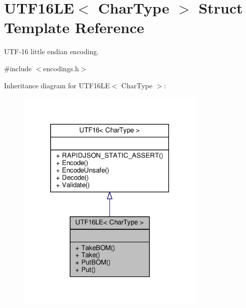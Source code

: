 \hypertarget{structUTF16LE}{}\section{U\+T\+F16\+LE$<$ Char\+Type $>$ Struct Template Reference}
\label{structUTF16LE}


U\+T\+F-\/16 little endian encoding.  




{\ttfamily \#include $<$encodings.\+h$>$}



Inheritance diagram for U\+T\+F16\+LE$<$ Char\+Type $>$\+:
\nopagebreak
\begin{figure}[H]
\begin{center}
\leavevmode
\includegraphics[width=257pt]{structUTF16LE__inherit__graph}
\end{center}
\end{figure}


